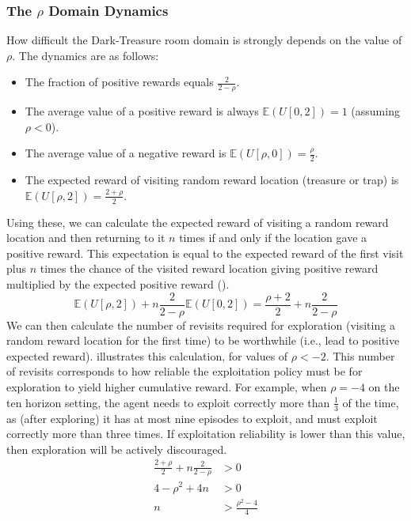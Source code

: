 \documentclass{article}
\begin{document}
\subsubsection{The \(\rho\) Domain Dynamics}
How difficult the Dark-Treasure room domain is strongly depends on the value of \(\rho\). The dynamics are as follows:
\begin{itemize}
    \item The fraction of positive rewards equals \(\frac{2}{2-\rho}\).
    \item The average value of a positive reward is always \(\mathbb{E}(U[0, 2]) = 1\) (assuming \(\rho < 0\)).
    \item The average value of a negative reward is \(\mathbb{E}(U[\rho, 0]) = \frac{\rho}{2}\).
    \item The expected reward of visiting random reward location (treasure or trap) is \(\mathbb{E}(U[\rho, 2]) = \frac{2 + \rho}{2}\).
\end{itemize}
Using these, we can calculate the expected reward of visiting a random reward location and then returning to it \(n\) times if and only if the location gave a positive reward. This expectation is equal to the expected reward of the first visit plus \(n\) times the chance of the visited reward location giving positive reward multiplied by the expected positive reward ().
\begin{equation}
\label{eqn:nexpct}
\mathbb{E}(U[\rho, 2]) + n\frac{2}{2-\rho} \mathbb{E}(U[0, 2]) = \frac{\rho+2}{2} + n\frac{2}{2-\rho}
\end{equation}
We can then calculate the number of revisits required for exploration (visiting a random reward location for the first time) to be worthwhile (i.e., lead to positive expected reward).  illustrates this calculation, for values of \(\rho < -2\). This number of revisits corresponds to how reliable the exploitation policy must be for exploration to yield higher cumulative reward. For example, when \(\rho = -4\) on the ten horizon setting, the agent needs to exploit correctly more than \(\frac{1}{3}\) of the time, as (after exploring) it has at most nine episodes to exploit, and must exploit correctly more than three times. If exploitation reliability is lower than this value, then exploration will be actively discouraged.
\begin{align}
\label{eqn:rhocalc}
\frac{2+\rho}{2} + n\frac{2}{2-\rho} &> 0 \\
4 - \rho^2 + 4n &> 0 \\
n &> \frac{\rho^2 - 4}{4}
\end{align}
\end{document}

